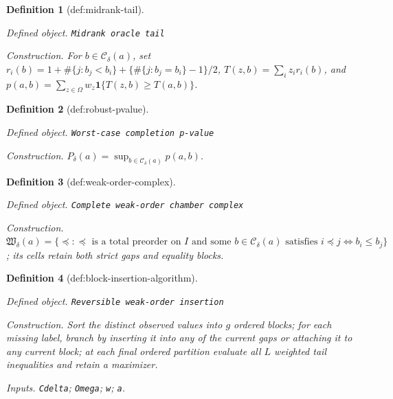 \documentclass{article}
\newtheorem{definition}{Definition}
\begin{document}
\begin{definition}[def:midrank-tail]\label{def:midrank-tail}
\par\smallskip\noindent\emph{Defined object.} \texttt{Midrank oracle tail}
\par\smallskip\noindent\emph{Construction.} For \(b\in\mathcal C_\delta(a)\), set \(r_i(b)=1+\#\{j:b_j<b_i\}+\{\#\{j:b_j=b_i\}-1\}/2\), \(T(z,b)=\sum_i z_i r_i(b)\), and \(p(a,b)=\sum_{z\in\Omega}w_z\mathbf 1\{T(z,b)\ge T(a,b)\}\).
\end{definition}

\begin{definition}[def:robust-pvalue]\label{def:robust-pvalue}
\par\smallskip\noindent\emph{Defined object.} \texttt{Worst-\allowbreak{}case completion p-\allowbreak{}value}
\par\smallskip\noindent\emph{Construction.} \(P_\delta(a)=\sup_{b\in\mathcal C_\delta(a)}p(a,b)\).
\end{definition}

\begin{definition}[def:weak-order-complex]\label{def:weak-order-complex}
\par\smallskip\noindent\emph{Defined object.} \texttt{Complete weak-\allowbreak{}order chamber complex}
\par\smallskip\noindent\emph{Construction.} \(\mathfrak W_\delta(a)=\{\preceq:\preceq\text{ is a total preorder on }I\text{ and some }b\in\mathcal C_\delta(a)\text{ satisfies }i\preceq j\Longleftrightarrow b_i\le b_j\}\); its cells retain both strict gaps and equality blocks.
\end{definition}

\begin{definition}[def:block-insertion-algorithm]\label{def:block-insertion-algorithm}
\par\smallskip\noindent\emph{Defined object.} \texttt{Reversible weak-\allowbreak{}order insertion}
\par\smallskip\noindent\emph{Construction.} Sort the distinct observed values into \(g\) ordered blocks; for each missing label, branch by inserting it into any of the current gaps or attaching it to any current block; at each final ordered partition evaluate all \(L\) weighted tail inequalities and retain a maximizer.
\par\smallskip\noindent\emph{Inputs.} \texttt{Cdelta}; \texttt{Omega}; \texttt{w}; \texttt{a}.
\end{definition}
\end{document}
